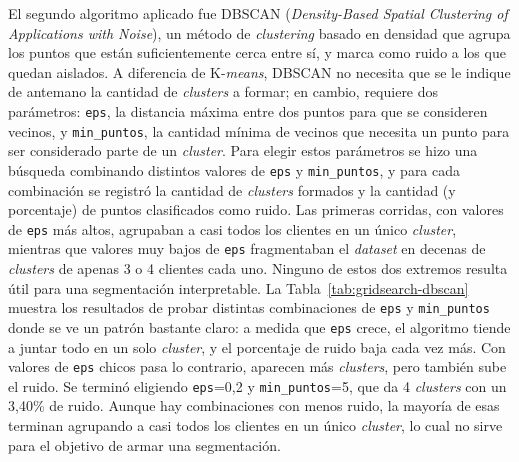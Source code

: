 \documentclass[a4paper,10pts,openany]{book}
\begin{document}
	El segundo algoritmo aplicado fue DBSCAN (\emph{Density-Based Spatial Clustering of Applications with Noise}), un método de \emph{clustering} basado en densidad que agrupa los puntos que están suficientemente cerca entre sí, y marca como ruido a los que quedan aislados. A diferencia de K-\emph{means}, DBSCAN no necesita que se le indique de antemano la cantidad de \emph{clusters} a formar; en cambio, requiere dos parámetros: \texttt{eps}, la distancia máxima entre dos puntos para que se consideren vecinos, y \texttt{min\_puntos}, la cantidad mínima de vecinos que necesita un punto para ser considerado parte de un \emph{cluster}. Para elegir estos parámetros se hizo una búsqueda combinando distintos valores de \texttt{eps} y \texttt{min\_puntos}, y para cada combinación se registró la cantidad de \emph{clusters} formados y la cantidad (y porcentaje) de puntos clasificados como ruido. Las primeras corridas, con valores de \texttt{eps} más altos, agrupaban a casi todos los clientes en un único \emph{cluster}, mientras que valores muy bajos de \texttt{eps} fragmentaban el \emph{dataset} en decenas de \emph{clusters} de apenas 3 o 4 clientes cada uno. Ninguno de estos dos extremos resulta útil para una segmentación interpretable. La Tabla~\ref{tab:gridsearch-dbscan} muestra los resultados de probar distintas combinaciones de \texttt{eps} y \texttt{min\_puntos} donde se ve un patrón bastante claro: a medida que \texttt{eps} crece, el algoritmo tiende a juntar todo en un solo \emph{cluster}, y el porcentaje de ruido baja cada vez más. Con valores de \texttt{eps} chicos pasa lo contrario, aparecen más \emph{clusters}, pero también sube el ruido.
	Se terminó eligiendo \texttt{eps}=0{,}2 y \texttt{min\_puntos}=5, que da 4 \emph{clusters} con un 3{,}40\% de ruido. Aunque hay combinaciones con menos ruido, la mayoría de esas terminan agrupando a casi todos los clientes en un único \emph{cluster}, lo cual no sirve para el objetivo de armar una segmentación.
	
\end{document}
